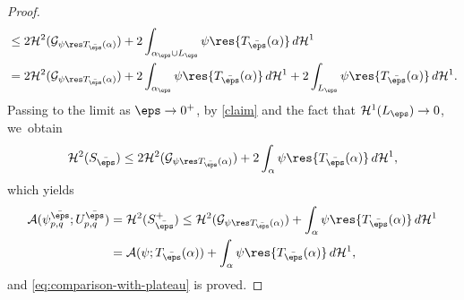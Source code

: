 \begin{proof}
\begin{equation*}
\begin{split}
&\le 2\mathcal{H}^2(\mathcal{G}_{\psi\res T_{\bar\eps}(\alpha)}) +
2\int_{\alpha_\eps\cup L_\eps}\psi\res{T_{\bar\eps}(\alpha)}\, d\mathcal{H}^1\\
&= 2\mathcal{H}^2(\mathcal{G}_{\psi\res T_{\bar\eps}(\alpha)}) + 2\int_{\alpha_\eps}\psi\res{T_{\bar\eps}(\alpha)}\, d\mathcal{H}^1+
2\int_{ L_\eps}\psi\res{T_{\bar\eps}(\alpha)}\,d\mathcal{H}^1.
\end{split}
\end{equation*}
Passing to the limit as $\eps\to0^+$, by \eqref{claim} and the fact that $\mathcal{H}^1(L_\eps)\to0$, we~obtain
\begin{equation*}
\mathcal{H}^2(S_{\bar\eps})\le
2\mathcal{H}^2(\mathcal{G}_{\psi\res T_{\bar\eps}(\alpha)}) +
2\int_{\alpha}\psi\res{T_{\bar\eps}(\alpha)} \,d\mathcal{H}^1,
\end{equation*}
which yields
\begin{align*}
\mathcal{A}(\psi_{p,q}^{\bar\eps};U_{p,q}^{\bar\eps})&=
\mathcal{H}^2(S_{\bar\eps}^+)\le
\mathcal{H}^2(\mathcal{G}_{\psi\res T_{\bar\eps}(\alpha)}) +
\int_{\alpha}\psi\res{T_{\bar\eps}(\alpha)}\,d\mathcal{H}^1\\
&=\mathcal{A}(\psi; T_{\bar\eps}(\alpha))+
\int_{\alpha}\psi\res{T_{\bar\eps}(\alpha)}\,d\mathcal{H}^1,
\end{align*}
and \eqref{eq:comparison-with-plateau} is proved.


\end{proof}

